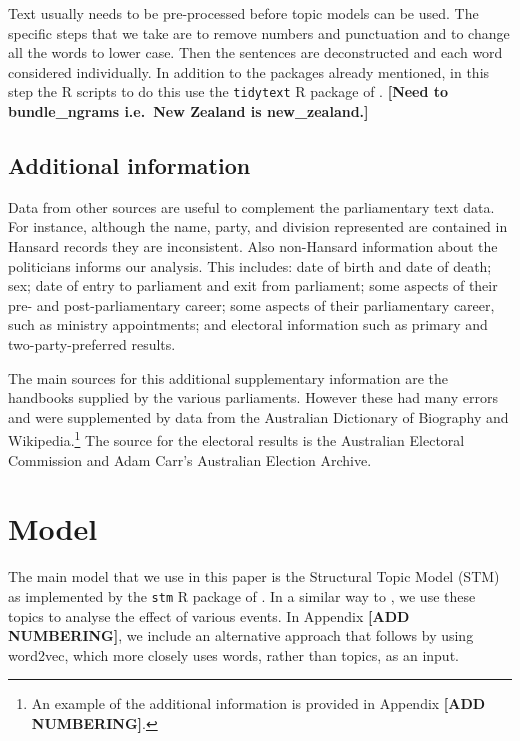 \documentclass[12pt,]{article}
\theoremstyle{definition}
\theoremstyle{definition}
\theoremstyle{definition}
\theoremstyle{remark}
\begin{document}
Text usually needs to be pre-processed before topic models can be used.
The specific steps that we take are to remove numbers and punctuation
and to change all the words to lower case. Then the sentences are
deconstructed and each word considered individually. In addition to the
packages already mentioned, in this step the R scripts to do this use
the \texttt{tidytext} R package of \citet{SilgeRobinson2016}.
\textbf{{[}Need to bundle\_ngrams i.e.~New Zealand is new\_zealand.{]}}

\subsection{Additional information}\label{additional-information}

Data from other sources are useful to complement the parliamentary text
data. For instance, although the name, party, and division represented
are contained in Hansard records they are inconsistent. Also non-Hansard
information about the politicians informs our analysis. This includes:
date of birth and date of death; sex; date of entry to parliament and
exit from parliament; some aspects of their pre- and post-parliamentary
career; some aspects of their parliamentary career, such as ministry
appointments; and electoral information such as primary and
two-party-preferred results.

The main sources for this additional supplementary information are the
handbooks supplied by the various parliaments. However these had many
errors and were supplemented by data from the Australian Dictionary of
Biography and Wikipedia.\footnote{An example of the additional
  information is provided in Appendix \textbf{{[}ADD NUMBERING{]}}.} The
source for the electoral results is the Australian Electoral Commission
and Adam Carr's Australian Election Archive.

\section{Model}\label{model}

The main model that we use in this paper is the Structural Topic Model
(STM) as implemented by the \texttt{stm} R package of
\citet{RobertsStewartAiroldiRPackage}. In a similar way to
\citet{MuellerRauh2018}, we use these topics to analyse the effect of
various events. In Appendix \textbf{{[}ADD NUMBERING{]}}, we include an
alternative approach that follows \citet{Taddy2015} by using word2vec,
which more closely uses words, rather than topics, as an input.
\end{document}
